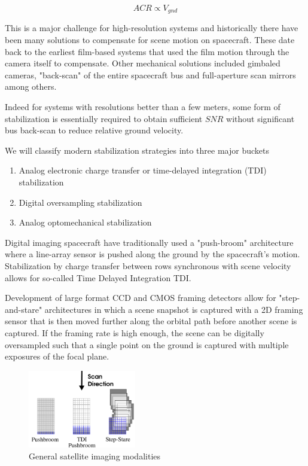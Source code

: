 \documentclass[10pt,journal]{IEEEtran}  %
\begin{document}
{$$ACR \propto V_{gnd}$$

This is a major challenge for high-resolution systems and historically there have been many solutions to compensate for scene motion on spacecraft.  These date back to the earliest film-based systems that used the film motion through the camera itself to compensate.  Other mechanical solutions included gimbaled cameras, "back-scan" of the entire spacecraft bus and full-aperture scan mirrors among others.

Indeed for systems with resolutions better than a few meters, some form of stabilization is essentially required to obtain sufficient $SNR$ without significant bus back-scan to reduce relative ground velocity.

We will classify modern stabilization strategies into three major buckets

\begin{enumerate}
\item Analog electronic charge transfer or time-delayed integration (TDI) stabilization
\item Digital oversampling stabilization
\item Analog optomechanical stabilization
\end{enumerate}

Digital imaging spacecraft have traditionally used a "push-broom" architecture where a line-array sensor is pushed along the ground by the spacecraft's motion.  Stabilization by charge transfer between rows synchronous with scene velocity allows for so-called Time Delayed Integration TDI.  

Development of large format CCD and CMOS framing detectors allow for  "step-and-stare" architectures in which a scene snapshot is captured with a 2D framing sensor that is then moved further along the orbital path before another scene is captured.  If the framing rate is high enough, the scene can be digitally oversampled such that a single point on the ground is captured with multiple exposures of the focal plane.

\begin{figure}[h!t]
\includegraphics[width=0.42\textwidth]{figures/modalities.png}
\caption{General satellite imaging modalities}
\label{fig:modalities}
\end{figure}

}
\end{document}
